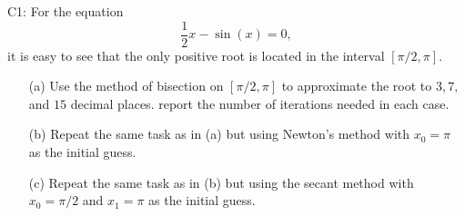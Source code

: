 \documentclass[12pt]{report}
\begin{document}
\begin{problem}
    C1: For the equation
    \[ 
        \frac{1}{2}x - \sin(x) = 0,
    \]
    it is easy to see that the only positive root is located in the interval $[\pi/2,\pi].$
    \begin{enumerate}
        \item [(a)] Use the method of bisection on $[\pi/2,\pi]$ to approximate the root to $3, 7,$ and $15$ decimal places. report the number of iterations needed in each case.
        \item [(b)] Repeat the same task as in (a) but using Newton's method with $x_0=\pi$ as the initial guess.
        \item [(c)] Repeat the same task as in (b) but using the secant method with $x_0=\pi/2$ and $x_1=\pi$ as the initial guess.
    \end{enumerate}
\end{problem}
\end{document}
